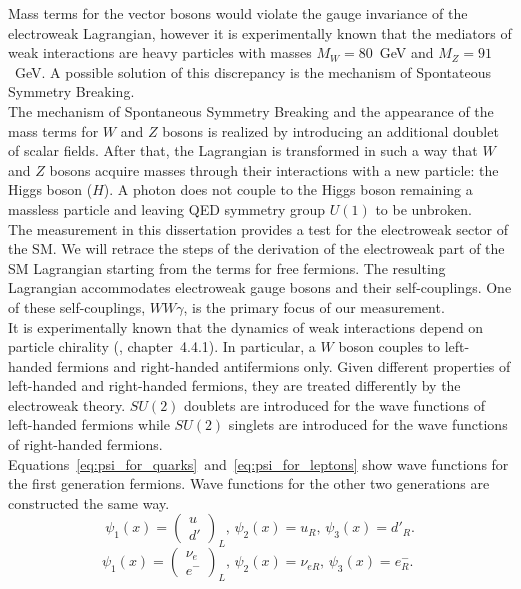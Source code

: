Mass terms for the vector bosons would violate the gauge invariance of the electroweak Lagrangian, however it is experimentally known that the mediators of weak interactions are heavy particles with masses $M_W=80$~GeV and $M_Z=91$~GeV. A possible solution of this discrepancy is the mechanism of Spontateous Symmetry Breaking.\\
The mechanism of Spontaneous Symmetry Breaking and the appearance of the mass terms for $W$ and $Z$ bosons is realized by introducing an additional doublet of scalar fields. After that, the Lagrangian is transformed in such a way that $W$ and $Z$ bosons acquire masses through their interactions with a new particle: the Higgs boson ($H$). A photon does not couple to the Higgs boson remaining a massless particle and leaving QED symmetry group $U(1)$ to be unbroken.\\
The measurement in this dissertation provides a test for the electroweak sector of the SM. We will retrace the steps of the derivation of the electroweak part of the SM Lagrangian starting from the terms for free fermions. The resulting Lagrangian accommodates electroweak gauge bosons and their self-couplings. One of these self-couplings, $WW\gamma$, is the primary focus of our measurement.\\
It is experimentally known that the dynamics of weak interactions depend on particle chirality (\cite{ref_Griffiths}, chapter~4.4.1). In particular, a $W$ boson couples to left-handed fermions and right-handed antifermions only. Given different properties of left-handed and right-handed fermions, they are treated differently by the electroweak theory. $SU(2)$ doublets are introduced for the wave functions of left-handed fermions while $SU(2)$ singlets are introduced for the wave functions of right-handed fermions. Equations~\ref{eq:psi_for_quarks}~and~\ref{eq:psi_for_leptons} show wave functions for the first generation fermions. Wave functions for the other two generations are constructed the same way.\\ 
\begin{equation}\label{eq:psi_for_quarks}
\psi_1(x)=\begin{pmatrix} u \\ d' \end{pmatrix}_L \text{, } \psi_2(x)=u_R \text{, } \psi_3(x)=d'_R \text{.}
\end{equation}
\begin{equation}\label{eq:psi_for_leptons}
\psi_1(x)=\begin{pmatrix} \nu_e \\ e^- \end{pmatrix}_L \text{, } \psi_2(x)=\nu_{eR} \text{, } \psi_3(x)=e^-_R \text{. }
\end{equation}
